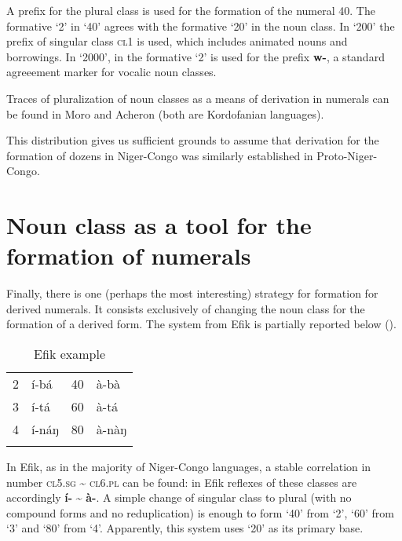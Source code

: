 A prefix for the plural class is used for the formation of the numeral 40. The formative ‘2’ in ‘40’ agrees with the formative ‘20’ in the noun class. In ‘200’ the prefix of singular class \textsc{cl}1 is used, which includes animated nouns and borrowings. In ‘2000’, in the formative ‘2’ is used for the prefix \textbf{w-}, a standard agreeement marker for vocalic noun classes. 

Traces of pluralization of noun classes as a means of derivation in numerals can be found in Moro and Acheron (both are Kordofanian languages). 

\largerpage
This distribution gives us sufficient grounds to assume that derivation for the formation of dozens in Niger-Congo was similarly established in Proto-Niger-Congo. 


\clearpage
\section{Noun class as a tool for the formation of numerals}%

Finally, there is one (perhaps the most interesting) strategy for formation for derived numerals. It consists exclusively of changing the noun class for the formation of a derived form. The system from Efik is partially reported below ().

\begin{table}
\caption{Efik example}
\label{tab:1:20}

\begin{tabularx}{.8\textwidth}{lXlX}
\lsptoprule

2 & í-bá & 40 & à-bà\\
3 & í-tá & 60 &   à-tá\\
4 & í-náŋ & 80 &   à-nàŋ\\
\lspbottomrule
\end{tabularx}
\end{table}



In Efik, as in the majority of Niger-Congo languages, a stable correlation in number \textsc{cl}5.\textsc{sg} {\textasciitilde} \textsc{cl}6.\textsc{pl} can be found: in Efik reflexes of these classes are accordingly \textbf{í-} {\textasciitilde} \textbf{à}\textbf{-}.  A simple change of singular class to plural (with no compound forms and no reduplication) is enough to form ‘40’ from ‘2’, ‘60’ from ‘3’ and ‘80’ from ‘4’. Apparently, this system uses ‘20’ as its primary base.  

